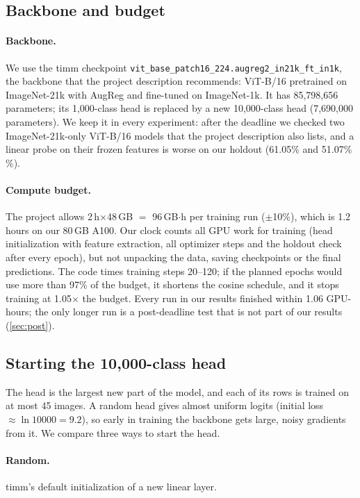 \subsection{Backbone and budget}
\label{sec:budget}

\paragraph{Backbone.}
We use the timm \citep{wightman2019timm} checkpoint \nolinkurl{vit_base_patch16_224.augreg2_in21k_ft_in1k}, the backbone that the project description recommends: ViT-B/16 pretrained on ImageNet-21k with AugReg and fine-tuned on ImageNet-1k.
It has 85,798,656 parameters; its 1,000-class head is replaced by a new 10,000-class head (7,690,000 parameters).
We keep it in every experiment: after the deadline we checked two ImageNet-21k-only ViT-B/16 models that the project description also lists, and a linear probe on their frozen features is worse on our holdout (61.05\% and 51.07\% \%).

\paragraph{Compute budget.}
The project allows 2\,h$\times$48\,GB $=$ 96\,GB$\cdot$h per training run ($\pm$10\%), which is 1.2 hours on our 80\,GB A100.
Our clock counts all GPU work for training (head initialization with feature extraction, all optimizer steps and the holdout check after every epoch), but not unpacking the data, saving checkpoints or the final predictions.
The code times training steps 20--120; if the planned epochs would use more than 97\% of the budget, it shortens the cosine schedule, and it stops training at 1.05$\times$ the budget.
Every run in our results finished within 1.06 GPU-hours; the only longer run is a post-deadline test that is not part of our results (\cref{sec:post}).

\subsection{Starting the 10,000-class head}
\label{sec:head-init}

The head is the largest new part of the model, and each of its rows is trained on at most 45 images.
A random head gives almost uniform logits (initial loss $\approx \ln 10000 = 9.2$), so early in training the backbone gets large, noisy gradients from it.
We compare three ways to start the head.

\paragraph{Random.} timm's default initialization of a new linear layer.

